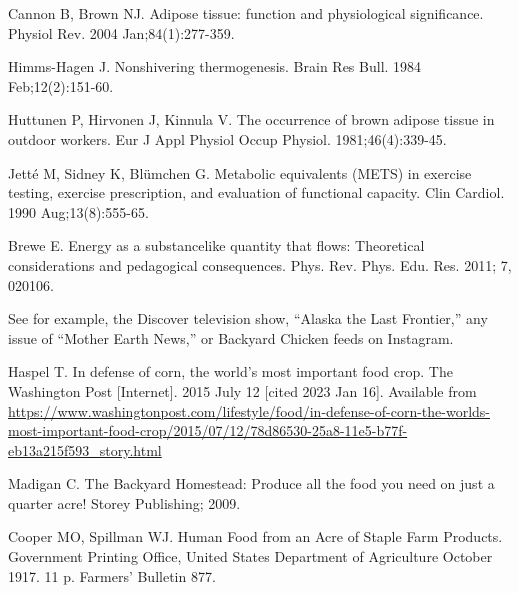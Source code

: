\documentclass[12pt]{iopart}
\begin{document}
\begin{thebibliography}{99}
Cannon B, Brown NJ. 
Adipose tissue: function and physiological significance.
Physiol Rev. 
2004 Jan;84(1):277-359. 

Himms-Hagen J. 
Nonshivering thermogenesis. 
Brain Res Bull. 
1984 Feb;12(2):151-60. 

Huttunen P, Hirvonen J, Kinnula V. 
The occurrence of brown adipose tissue in outdoor workers. 
Eur J Appl Physiol Occup Physiol. 
1981;46(4):339-45. 

Jetté M, Sidney K, Blümchen G. 
Metabolic equivalents (METS) in exercise testing, exercise prescription, and evaluation of functional capacity. 
Clin Cardiol. 
1990 Aug;13(8):555-65. 

Brewe E.
Energy as a substancelike quantity that flows: Theoretical considerations
and pedagogical consequences.
Phys. Rev. Phys. Edu. Res.
2011; 7, 020106.

See for example, the Discover television show, ``Alaska the Last Frontier,'' any issue of ``Mother Earth News,'' or Backyard Chicken feeds on Instagram.  
 
 
Haspel T.
In defense of corn, the world’s most important food crop.
The Washington Post [Internet].
2015 July 12 [cited 2023 Jan 16].
Available from \url{https://www.washingtonpost.com/lifestyle/food/in-defense-of-corn-the-worlds-most-important-food-crop/2015/07/12/78d86530-25a8-11e5-b77f-eb13a215f593_story.html}

Madigan C. 
The Backyard Homestead: Produce all the food you need on just a quarter acre!
Storey Publishing; 2009.



Cooper MO, Spillman WJ.
Human Food from an Acre of Staple Farm Products.
Government Printing Office, United States Department of Agriculture
October 1917.
11 p.
Farmers' Bulletin 877.



\end{thebibliography}
\end{document}
